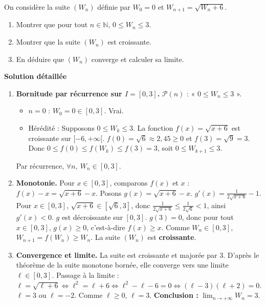 \documentclass[11pt]{article}
\begin{document}
\begin{exoresolu}
    On considère la suite $(W_n)$ définie par $W_0 = 0$ et $W_{n+1} = \sqrt{W_n + 6}$.
    \begin{enumerate}
        \item Montrer que pour tout $n \in \mathbb{N}$, $0 \le W_n \le 3$.
        \item Montrer que la suite $(W_n)$ est croissante.
        \item En déduire que $(W_n)$ converge et calculer sa limite.
    \end{enumerate}
    \tcblower
    \textbf{Solution détaillée}
    \begin{enumerate}
        \item \textbf{Bornitude par récurrence sur $I=[0,3]$.}
        $\mathcal{P}(n)$ : « $0 \le W_n \le 3$ ».
        \begin{itemize}
            \item $n=0$ : $W_0=0 \in [0,3]$. Vrai.
            \item Hérédité : Supposons $0 \le W_k \le 3$. La fonction $f(x)=\sqrt{x+6}$ est croissante sur $[-6,+\infty[$.
            $f(0) = \sqrt{6} \approx 2,45 \ge 0$ et $f(3) = \sqrt{9} = 3$.
            Donc $0 \le f(0) \le f(W_k) \le f(3) = 3$, soit $0 \le W_{k+1} \le 3$.
        \end{itemize}
        Par récurrence, $\forall n,\ W_n \in [0,3]$.
        \item \textbf{Monotonie.}
        Pour $x \in [0,3]$, comparons $f(x)$ et $x$ : $f(x) - x = \sqrt{x+6} - x$.
        Posons $g(x) = \sqrt{x+6} - x$. $g'(x) = \frac{1}{2\sqrt{x+6}} - 1$.
        Pour $x \in [0,3]$, $\sqrt{x+6} \in [\sqrt{6}, 3]$, donc $\frac{1}{2\sqrt{x+6}} \le \frac{1}{2\sqrt{6}} < 1$, ainsi $g'(x) < 0$.
        $g$ est décroissante sur $[0,3]$. $g(3) = 0$, donc pour tout $x \in [0,3]$, $g(x) \ge 0$, c'est-à-dire $f(x) \ge x$.
        Comme $W_n \in [0,3]$, $W_{n+1} = f(W_n) \ge W_n$.
        La suite $(W_n)$ est \textbf{croissante}.
        \item \textbf{Convergence et limite.}
        La suite est croissante et majorée par $3$. D'après le théorème de la suite monotone bornée, elle converge vers une limite $\ell \in [0,3]$.
        Passage à la limite : $\ell = \sqrt{\ell + 6} \iff \ell^2 = \ell + 6 \iff \ell^2 - \ell - 6 = 0 \iff (\ell-3)(\ell+2)=0$.
        $\ell = 3$ ou $\ell = -2$. Comme $\ell \ge 0$, $\ell = 3$.
        \textbf{Conclusion :} $\lim_{n\to+\infty} W_n = 3$.
    \end{enumerate}
\end{exoresolu}
\end{document}

